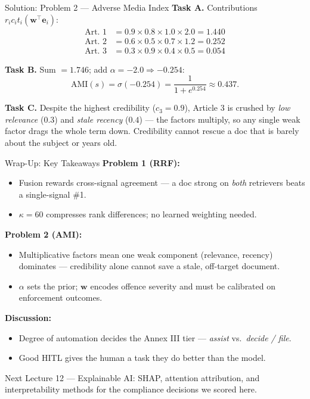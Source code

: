 \documentclass[9pt,t]{beamer}
\begin{document}
\begin{frame}{Solution: Problem 2 --- Adverse Media Index}
\textbf{Task A.} Contributions $r_i c_i t_i (\mathbf{w}^{\top}\mathbf{e}_i)$:
\begin{align*}
\text{Art.\ 1} &= 0.9 \times 0.8 \times 1.0 \times 2.0 = 1.440 \\
\text{Art.\ 2} &= 0.6 \times 0.5 \times 0.7 \times 1.2 = 0.252 \\
\text{Art.\ 3} &= 0.3 \times 0.9 \times 0.4 \times 0.5 = 0.054
\end{align*}

\textbf{Task B.} Sum $= 1.746$; add $\alpha = -2.0 \Rightarrow -0.254$:
\[
\mathrm{AMI}(s) = \sigma(-0.254) = \frac{1}{1+e^{0.254}} \approx \mathbf{0.437}.
\]

\medskip
\textbf{Task C.} Despite the highest credibility ($c_3 = 0.9$), Article 3 is
crushed by \emph{low relevance} ($0.3$) and \emph{stale recency} ($0.4$) ---
the factors multiply, so any single weak factor drags the whole term down.
Credibility cannot rescue a doc that is barely about the subject or years old.
\end{frame}

\begin{frame}{Wrap-Up: Key Takeaways}
\textbf{Problem 1 (RRF):}
\begin{itemize}\footnotesize
  \item Fusion rewards cross-signal agreement --- a doc strong on \emph{both}
        retrievers beats a single-signal \#1.
  \item $\kappa = 60$ compresses rank differences; no learned weighting needed.
\end{itemize}

\medskip
\textbf{Problem 2 (AMI):}
\begin{itemize}\footnotesize
  \item Multiplicative factors mean one weak component (relevance, recency)
        dominates --- credibility alone cannot save a stale, off-target document.
  \item $\alpha$ sets the prior; $\mathbf{w}$ encodes offence severity and must be
        calibrated on enforcement outcomes.
\end{itemize}

\medskip
\textbf{Discussion:}
\begin{itemize}\footnotesize
  \item Degree of automation decides the Annex III tier --- \emph{assist} vs.\
        \emph{decide / file}.
  \item Good HITL gives the human a task they do better than the model.
\end{itemize}

\medskip
\begin{block}{Next}
Lecture 12 --- Explainable AI: SHAP, attention attribution, and interpretability
methods for the compliance decisions we scored here.
\end{block}
\end{frame}
\end{document}
